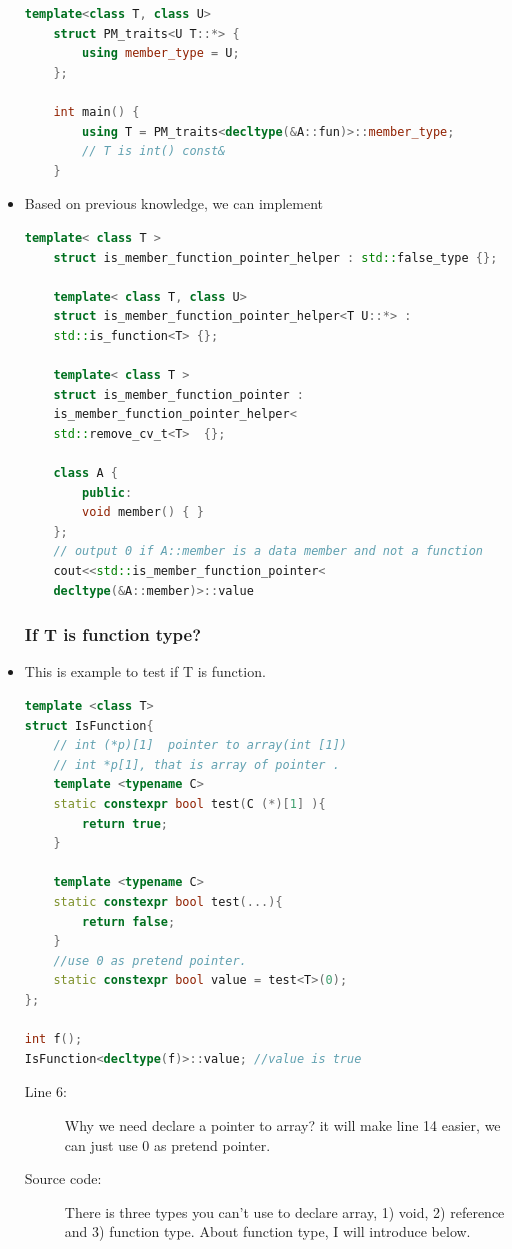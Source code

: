 \documentclass[a4paper,11pt,twoside]{book}
\begin{document}
\begin{itemize}
\begin{lstlisting}[frame=single, language=c++]
	template<class T, class U>
	struct PM_traits<U T::*> {
		using member_type = U;
	};
	
	int main() {
		using T = PM_traits<decltype(&A::fun)>::member_type; 
		// T is int() const&
	}
\end{lstlisting}

\item Based on previous knowledge, we can implement 
\begin{lstlisting}[frame=single, language=c++]
	template< class T >
	struct is_member_function_pointer_helper : std::false_type {};
	
	template< class T, class U>
	struct is_member_function_pointer_helper<T U::*> :
	std::is_function<T> {};
	
	template< class T >
	struct is_member_function_pointer : 
	is_member_function_pointer_helper<
	std::remove_cv_t<T>  {};
	
	class A {
		public:
		void member() { }
	};
	// output 0 if A::member is a data member and not a function
	cout<<std::is_member_function_pointer<
	decltype(&A::member)>::value
\end{lstlisting}

\subsubsection{ If T is function type? }

\item This is example to test if T is function.
\begin{lstlisting}[frame=single, language=c++]
template <class T>
struct IsFunction{
	// int (*p)[1]  pointer to array(int [1])
	// int *p[1], that is array of pointer .
	template <typename C> 
	static constexpr bool test(C (*)[1] ){
		return true;
	}
	
	template <typename C> 
	static constexpr bool test(...){
		return false;
	}
	//use 0 as pretend pointer.
	static constexpr bool value = test<T>(0);
};

int f();
IsFunction<decltype(f)>::value; //value is true 
\end{lstlisting}
\begin{description}
		\item[Line 6:] Why we need declare a pointer to array? it will make line 14 easier, we can just use 0 as pretend pointer.
	\item[Source code:] There is three types you can't use to declare array, 1) void, 2) reference and 3) function type.  About function type, I will introduce below. 
\end{description}


\end{itemize}
\end{document}
